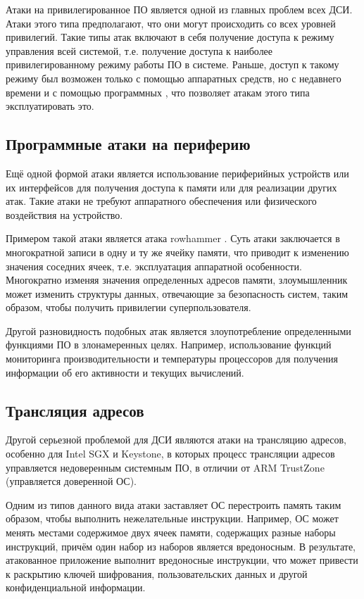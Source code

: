 Атаки на привилегированное ПО является одной из главных проблем всех ДСИ. Атаки этого типа предполагают, что они могут происходить со всех уровней привилегий. Такие типы атак включают в себя получение доступа к режиму управления всей системой, т.е. получение доступа к наиболее привилегированному режиму работы ПО в системе. Раньше, доступ к такому режиму был возможен только с помощью аппаратных средств, но с недавнего времени и с помощью программных \cite{comparsion-arm-intel}, что позволяет атакам этого типа эксплуатировать это.

\subsection{Программные атаки на периферию}

Ещё одной формой атаки является использование периферийных устройств или их интерфейсов для получения доступа к памяти или для реализации других атак. Такие атаки не требуют аппаратного обеспечения или физического воздействия на устройство. 

Примером такой атаки является атака rowhammer \cite{rowhammer}. Суть атаки заключается в многократной записи в одну и ту же ячейку памяти, что приводит к изменению значения соседних ячеек, т.е. эксплуатация аппаратной особенности. Многократно изменяя значения определенных адресов памяти, злоумышленник может изменить структуры данных, отвечающие за безопасность систем, таким образом, чтобы получить привилегии суперпользователя.

Другой разновидность подобных атак является злоупотребление определенными функциями ПО в злонамеренных целях. Например, использование функций мониторинга производительности и температуры процессоров для получения информации об его активности и текущих вычислений.

\subsection{Трансляция адресов}

Другой серьезной проблемой для ДСИ являются атаки на трансляцию адресов, особенно для Intel SGX и Keystone, в которых процесс трансляции адресов управляется недоверенным системным ПО, в отличии от ARM TrustZone (управляется доверенной ОС).

Одним из типов данного вида атаки заставляет ОС перестроить память таким образом, чтобы выполнить нежелательные инструкции. Например, ОС может менять местами содержимое двух ячеек памяти, содержащих разные наборы инструкций, причём один набор из наборов является вредоносным. В результате, атакованное приложение выполнит вредоносные инструкции, что может привести к раскрытию ключей шифрования, пользовательских данных и другой конфиденциальной информации.

